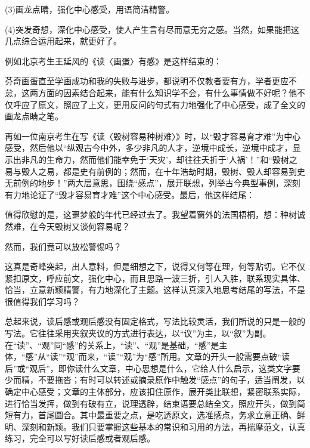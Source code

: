 (3)画龙点睛，强化中心感受，用语简洁精警。

(4)突发奇想，深化中心感受，使人产生言有尽而意无穷之感。当然，如果能把这几点综合运用起来，就更好了。

例如北京考生王延风的《读〈画蛋〉有感》是这样结束的：

芬奇画蛋直至学画成功和我的失败与进步，都说明不仅教者要有方，学者更应不怠，这两方面的因素结合起来，能有什么知识学不会，有什么事情做不好呢？他不仅呼应了原文，照应了上文，更用反问的句式有力地强化了中心感受，成了全文的画龙点睛之笔。

再如一位南京考生在写《读〈毁树容易种树难〉》时，以“毁才容易育才难”为中心感受，然后他以“纵观古今中外，多少非凡的人才，逆境中成长，逆境中成才，显示出非凡的生命力，然而他们能幸免于‘天灾’，却往往夭折于‘人祸’！”和“毁树之易与毁人之易，都是史有前例的；然而，在十年浩劫时期，毁树、毁人却容易到史无前例的地步！”两大层意思，围绕“感点”，展开联想，列举古今典型事例，深刻有力地论证了“毁才容易育才难”这个中心感受。最后，他这样结尾：

值得欣慰的是，这噩梦般的年代已经过去了。我望着窗外的法国梧桐，想：种树诚然难，在今天毁树又谈何容易呢？

然而，我们竟可以放松警惕吗？

这真是奇峰突起，出人意料，但是细想之下，说得又何等在理，何等贴切。它不仅紧扣原文，呼应前文，强化中心，而且思路一波三折，引人入胜，联系现实具体、恰当，立意新颖精警，有力地深化了主题。这样认真深入地思考结尾的写法，不是很值得我们学习吗？

总起来说，读后感或观后感没有固定格式，写法比较灵活，我们所说的只是一般的写法。它往往采用夹叙夹议的方式进行表达，以“议”为主，以“叙”为副。在“读”、“观”同“感”的关系上，“读”、“观”是基础，“感”是主体，“感”从“读”“观”而来，“读”“观”为“感”所用。文章的开头一般需要点破“读后”或“观后”，即你读什么文章，中心思想是什么，它给人什么启示，这类文字要少而精，不要拖沓；有时可以转述或摘录原作中触发“感点”的句子，适当阐发，以确定中心感受；文章的主体部分，应该扣住原作，展开类比联想，紧密联系实际，进行恰当发挥，做到有破有立，说理透辟，结束语要总结全文，照应开头，做到简短有力，首尾圆合。其中最重要之点，是吃透原文，选准感点，务求立意正确、鲜明、深刻和新颖。我们只要掌握这些基本的常识和习用的方法，再揣摩范文，认真练习，完全可以写好读后感或者观后感。
\newpage